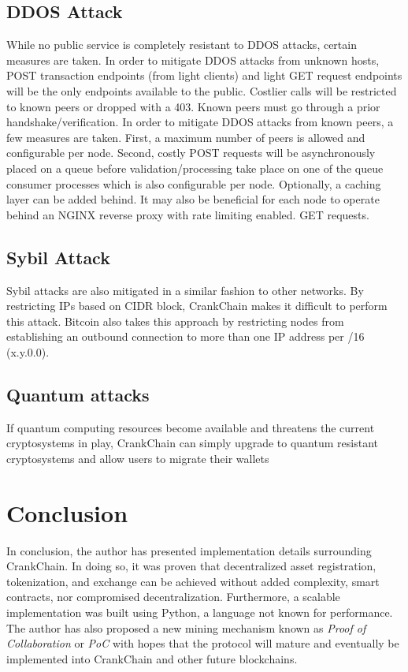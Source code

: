 \documentclass[10pt,twocolumn]{article}
\begin{document}
\subsection{DDOS Attack}
While no public service is completely resistant to DDOS attacks, certain measures are taken.  In order to mitigate DDOS attacks from unknown hosts, POST transaction endpoints (from light clients) and light GET request endpoints will be the only endpoints available to the public.  Costlier calls will be restricted to known peers or dropped with a 403.  Known peers must go through a prior handshake/verification.  In order to mitigate DDOS attacks from known peers, a few measures are taken.  First, a maximum number of peers is allowed and configurable per node.  Second, costly POST requests will be asynchronously placed on a queue before validation/processing take place on one of the queue consumer processes which is also configurable per node.  Optionally, a caching layer can be added behind.  It may also be beneficial for each node to operate behind an NGINX reverse proxy with rate limiting enabled.
GET requests.  
\subsection{Sybil Attack}
Sybil attacks are also mitigated in a similar fashion to other networks.  By restricting IPs based on CIDR block, CrankChain makes it difficult to perform this attack.  Bitcoin also takes this approach by restricting nodes from establishing an outbound connection to more than one IP address per /16 (x.y.0.0).
\subsection{Quantum attacks}
If quantum computing resources become available and threatens the current cryptosystems in play, CrankChain can simply upgrade to quantum resistant cryptosystems and allow users to migrate their wallets


\section{Conclusion}
In conclusion, the author has presented implementation details surrounding CrankChain.  In doing so, it was proven that decentralized asset registration, tokenization, and exchange can be achieved without added complexity, smart contracts, nor compromised decentralization.  Furthermore, a scalable implementation was built using Python, a language not known for performance.  \\
The author has also proposed a new mining mechanism known as \textit{Proof of Collaboration} or \textit{PoC} with hopes that the protocol will mature and eventually be implemented into CrankChain and other future blockchains.
\end{document}
